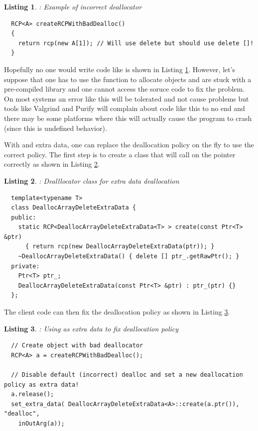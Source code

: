 \documentclass[pdf,ps2pdf,11pt]{SANDreport}
\newtheorem{listing}{Listing}
\begin{document}
\begin{listing}: Example of incorrect deallocator \\
\label{listing:createRCPWithBadDealloc}
{\small\begin{verbatim}
  RCP<A> createRCPWithBadDealloc()
  {
    return rcp(new A[1]); // Will use delete but should use delete []!
  }
\end{verbatim}}
\end{listing}

Hopefully no one would write code like is shown in Listing
{}\ref{listing:createRCPWithBadDealloc}.  However, let's suppose that
one has to use the function {} to
allocate {} objects and are stuck with a pre-compiled library
and one cannot access the soruce code to fix the problem.  On most
systems an error like this will be tolerated and not cause problems
but tools like Valgrind and Purify will complain about code like this
to no end and there may be some platforms where this will actually
cause the program to crash (since this is undefined behavior).

With {} and extra data, one can replace the deallocation
policy on the fly to use the correct policy.  The first step is to
create a class that will call {} on the pointer
correctly as shown in Listing
{}\ref{listing:DeallocArrayDeleteExtraData}.


\begin{listing}: Dealllocator class for extra data deallocation \\
\label{listing:DeallocArrayDeleteExtraData}
{\small\begin{verbatim}
  template<typename T>
  class DeallocArrayDeleteExtraData {
  public:
    static RCP<DeallocArrayDeleteExtraData<T> > create(const Ptr<T> &ptr)
      { return rcp(new DeallocArrayDeleteExtraData(ptr)); }
    ~DeallocArrayDeleteExtraData() { delete [] ptr_.getRawPtr(); }
  private:
    Ptr<T> ptr_;
    DeallocArrayDeleteExtraData(const Ptr<T> &ptr) : ptr_(ptr) {}
  };
\end{verbatim}}
\end{listing}


The client code can then fix the deallocation policy as shown in
Listing {}\ref{listing:using-DeallocArrayDeleteExtraData}.


{}\begin{listing}: Using {} as extra
data to fix deallocation policy
\label{listing:using-DeallocArrayDeleteExtraData}
{\small\begin{verbatim}
  // Create object with bad deallocator
  RCP<A> a = createRCPWithBadDealloc();

  // Disable default (incorrect) dealloc and set a new deallocation policy as extra data!
  a.release();
  set_extra_data( DeallocArrayDeleteExtraData<A>::create(a.ptr()), "dealloc",
    inOutArg(a));
\end{verbatim}}
\end{listing}
\end{document}
